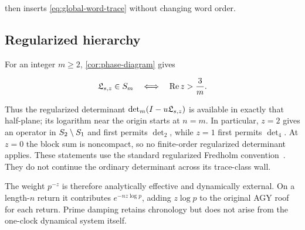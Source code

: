 then inserts \cref{eq:global-word-trace} without changing word order.

\subsection{Regularized hierarchy}

For an integer \(m\ge2\), \cref{cor:phase-diagram} gives

\begin{equation}
 \mathfrak L_{s,z}\in S_{m}
 \quad\Longleftrightarrow\quad
 \operatorname{Re}z>\frac3m.
 \label{eq:regularized-region}
\end{equation}

Thus the regularized determinant \(\det_m(I-u\mathfrak L_{s,z})\) is available in
exactly that half-plane; its logarithm near the origin starts at \(n=m\).
In particular, \(z=2\) gives an operator in
\(S_{2}\setminus S_{1}\) and first permits \(\det_2\), while
\(z=1\) first permits \(\det_4\).  At \(z=0\) the block sum is noncompact,
so no finite-order regularized determinant applies.  These statements use
the standard regularized Fredholm convention~\citep{simon2005,britz2021}.
They do not continue the ordinary determinant across its trace-class wall.

The weight \(p^{-z}\) is therefore analytically effective and dynamically
external.  On a length-\(n\) return it contributes \(e^{-nz\log p}\), adding
\(z\log p\) to the original AGY roof for each return.  Prime damping retains
chronology but does not arise from the one-clock dynamical system itself.
